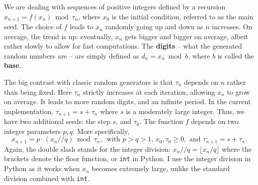 \documentclass[oneside,10pt]{book}
\begin{document}
We are dealing with sequences of positive integers defined by a recursion $x_{n+1} = f(x_n) \bmod{\tau_n}$, where $x_0$ is the initial condition, referred to as the main seed. The choice of $f$ leads to $x_n$ randomly going up and down as $n$ increases. On average, the trend is up: eventually,  $x_n$ gets bigger and bigger on average, albeit rather slowly to allow for fast computations. The {\bf digits} -- what the generated random numbers are -- are simply defined as $d_n = x_n \bmod{b}$, where $b$ is called the {\bf base}. 

The big contrast with classic random generators is that $\tau_n$ depends on $n$ rather than being fixed. Here $\tau_n$ strictly increases at each iteration, allowing $x_n$ to grow on average. It leads to more random digits, and an infinite period. In the current implementation, $\tau_{n+1} = s + \tau_n$ where $s$ is a moderately large integer. Thus, we have two additional seeds: the step $s$, and $\tau_0$. The function $f$
 depends on two integer parameters $p, q$. More specifically,
\begin{equation}
x_{n+1} = p \cdot (x_n // q) \bmod{\tau_n},\, \text{ with } p > q > 1, \, x_0, \tau_0\geq 0, \text{ and } \tau_{n+1} = s + \tau_n.\label{sd20h}
\end{equation}
Again, the double slash stands for the integer division: $x_n // q = \lfloor x_n / q\rfloor$ where the brackets denote the floor function, 
or \texttt{int} in Python. I use the integer division in Python as it works when $x_n$ becomes extremely large, unlike the standard division combined with \texttt{int}.
\end{document}
